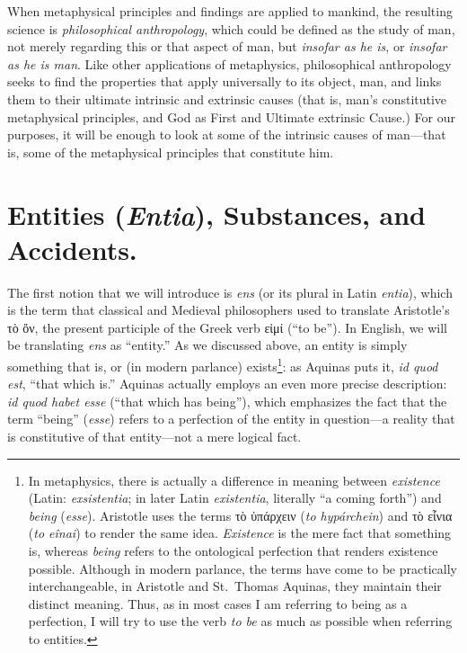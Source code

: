 \documentclass[article,12pt,a4paper,oneside]{memoir}
\begin{document}
    When metaphysical principles and findings are applied to mankind,
    the resulting science is \emph{philosophical anthropology}, which
    could be defined as the study of man, not merely regarding this or
    that aspect of man, but \emph{insofar as he is}, or \emph{insofar as
    he is man}. Like other applications of metaphysics, philosophical
    anthropology seeks to find the properties that apply universally to
    its object, man, and links them to their ultimate intrinsic and
    extrinsic causes (that is, man's constitutive metaphysical
    principles, and God as First and Ultimate extrinsic Cause.) For our
    purposes, it will be enough to look at some of the intrinsic causes
    of man---that is, some of the metaphysical principles that
    constitute him.

    \hypertarget{entities-entia-substances-and-accidents.}{%
    \section{\texorpdfstring{Entities (\emph{Entia}), Substances, and
    Accidents.}{Entities (Entia), Substances, and Accidents.}}\label{entities-entia-substances-and-accidents.}}

    The first notion that we will introduce is \emph{ens} (or its plural
    in Latin \emph{entia}), which is the term that classical and
    Medieval philosophers used to translate Aristotle's τὸ ὄν, the
    present participle of the Greek verb εἰμί (``to be''). In English,
    we will be translating \emph{ens} as ``entity.'' As we discussed
    above, an entity is simply something that is, or (in modern
    parlance) exists\footnote{In metaphysics, there is actually a
      difference in meaning between \emph{existence} (Latin:
      \emph{exsistentia}; in later Latin \emph{existentia}, literally
      ``a coming forth'') and \emph{being} (\emph{esse}). Aristotle uses
      the terms τὸ ὑπάρχειν (\emph{to hypárchein}) and τὸ εἶνια
      (\emph{to eînai}) to render the same idea. \emph{Existence} is the
      mere fact that something is, whereas \emph{being} refers to the
      ontological perfection that renders existence possible. Although
      in modern parlance, the terms have come to be practically
      interchangeable, in Aristotle and St.~Thomas Aquinas, they
      maintain their distinct meaning. Thus, as in most cases I am
      referring to being as a perfection, I will try to use the verb
      \emph{to be} as much as possible when referring to entities.}: as
    Aquinas puts it, \emph{id quod est}, ``that which is.'' Aquinas
    actually employs an even more precise description: \emph{id quod
    habet esse} (``that which has being''), which emphasizes the fact
    that the term ``being'' (\emph{esse}) refers to a perfection of the
    entity in question---a reality that is constitutive of that
    entity---not a mere logical fact.
\end{document}
